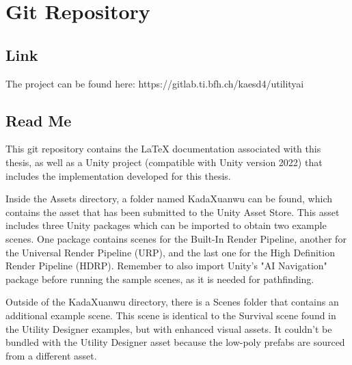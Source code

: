 \chapter{Git Repository}
\label{chap:appendix_stories}

\section{Link}

The project can be found here: https://gitlab.ti.bfh.ch/kaesd4/utilityai

\section{Read Me}

This git repository contains the LaTeX documentation associated with this thesis, as well as a Unity project (compatible with Unity version 2022) that includes the implementation developed for this thesis.

Inside the Assets directory, a folder named KadaXuanwu can be found, which contains the asset that has been submitted to the Unity Asset Store. This asset includes three Unity packages which can be imported to obtain two example scenes. One package contains scenes for the Built-In Render Pipeline, another for the Universal Render Pipeline (URP), and the last one for the High Definition Render Pipeline (HDRP). Remember to also import Unity's "AI Navigation" package before running the sample scenes, as it is needed for pathfinding.

Outside of the KadaXuanwu directory, there is a Scenes folder that contains an additional example scene. This scene is identical to the Survival scene found in the Utility Designer examples, but with enhanced visual assets. It couldn't be bundled with the Utility Designer asset because the low-poly prefabs are sourced from a different asset.